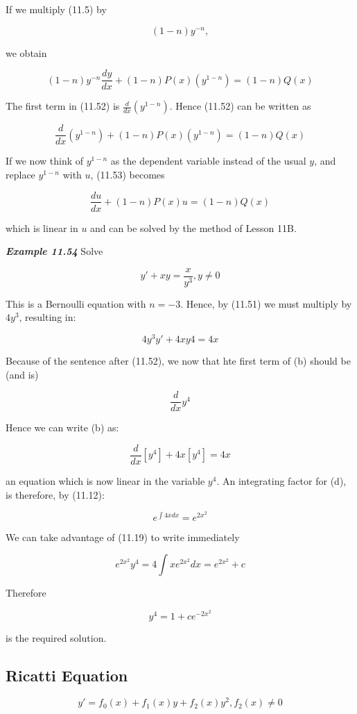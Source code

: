 \documentclass{article}
\begin{document}
If we multiply (11.5) by

\[ \tag{11.51} (1-n)y^{-n}, \]

we obtain

\[ \tag{11.52} (1-n)y^{-n}\frac{dy}{dx} + (1-n)P(x)(y^{1-n})=(1-n)Q(x) \]

The first term in (11.52) is $\frac{d}{dx}(y^{1-n})$. Hence (11.52) can be written as

\[ \tag{11.53} \frac{d}{dx}(y^{1-n}) + (1-n)P(x)(y^{1-n}) = (1-n)Q(x) \]

If we now think of $y^{1-n}$ as the dependent variable instead of the usual $y$, and replace $y^{1-n}$ with $u$, (11.53) becomes

\[ \frac{du}{dx} + (1 - n)P(x)u = (1-n)Q(x) \]

which is linear in $u$ and can be solved by the method of Lesson 11B.

\emph{\textbf{Example 11.54}}
Solve

\[ \tag{a} y' + xy = \frac{x}{y^3}, y \neq 0 \]

This is a Bernoulli equation with $n = -3$. Hence, by (11.51) we must multiply by $4y^3$, resulting in:

\[ \tag{b} 4y^3y' + 4xy4 = 4x \]

Because of the sentence after (11.52), we now that hte first term of (b) should be (and is)

\[ \tag{c} \frac{d}{dx}y^4 \]

Hence we can write (b) as:

\[ \tag{d} \frac{d}{dx}[y^4] + 4x[y^4] = 4x \]

an equation which is now linear in the variable $y^4$. An integrating factor for (d), is therefore, by (11.12):

\[ \tag{e} e^{\int 4xdx} = e^{2x^2} \]

We can take advantage of (11.19) to write immediately

\[ \tag{f} e^{2x^2}y^4 = 4 \int xe^{2x^2}dx = e^{2x^2} + c \]

Therefore

\[ \tag{g} y^4 = 1 + ce^{-2x^2} \]

is the required solution.

\subsection{Ricatti Equation}

\[ \tag{11.6} y' = f_0(x) + f_1(x)y + f_2(x)y^2, f_2(x) \neq 0 \]
\end{document}
